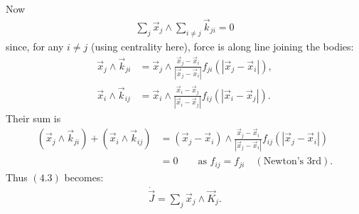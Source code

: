 \documentclass[12pt]{article}
\begin{document}
Now
\begin{align*}
\sum_j \vec{x}_j \wedge \sum_{i\neq j}\vec{k}_{ji}=0
\end{align*}
since, for any $i\neq j$ (using centrality here), force is along line joining the bodies:
\begin{align*}
\vec{x}_j\wedge\vec{k}_{ji}
&=
\vec{x}_j\wedge
\frac{\vec{x}_j-\vec{x}_i}{|\vec{x}_j-\vec{x}_i|}
f_{ji}(|\vec{x}_j-\vec{x}_i|), \\
\vec{x}_i\wedge\vec{k}_{ij}
&=
\vec{x}_i\wedge
\frac{\vec{x}_i-\vec{x}_j}{|\vec{x}_i-\vec{x}_j|}
f_{ij}(|\vec{x}_i-\vec{x}_j|).
\end{align*}
Their sum is
\begin{align*}
(\vec{x}_j\wedge\vec{k}_{ji})+(\vec{x}_i\wedge\vec{k}_{ij})
&=
(\vec{x}_j-\vec{x}_i)\wedge
\frac{\vec{x}_j-\vec{x}_i}{|\vec{x}_j-\vec{x}_i|}
f_{ij}(|\vec{x}_j-\vec{x}_i|) \\
&=0
\qquad \text{as } f_{ij}=f_{ji}\quad(\text{Newton's 3rd}).
\end{align*}
Thus $(4.3)$ becomes:
\begin{align*}
\dot{\vec{J}}=\sum_j \vec{x}_j\wedge\vec{K}_j.
\end{align*}
\end{document}

